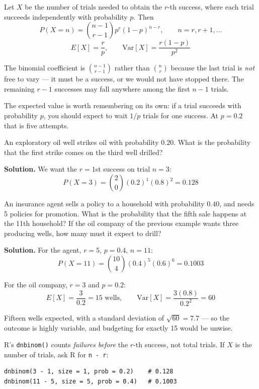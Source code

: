 \documentclass[a4paper,11pt]{article}
\begin{document}
\begin{keybox}
Let $X$ be the number of trials needed to obtain the $r$-th success, where each
trial succeeds independently with probability $p$. Then
\[ P(X = n) = \binom{n-1}{r-1}p^{r}(1-p)^{n-r}, \qquad n = r, r+1, \ldots \]
\[ E[X] = \frac{r}{p}, \qquad \mathrm{Var}[X] = \frac{r(1-p)}{p^{2}} \]
\end{keybox}

The binomial coefficient is $\binom{n-1}{r-1}$ rather than $\binom{n}{r}$
because the last trial is \emph{not} free to vary --- it must be a success, or
we would not have stopped there. The remaining $r-1$ successes may fall anywhere
among the first $n-1$ trials.

The expected value is worth remembering on its own: if a trial succeeds with
probability $p$, you should expect to wait $1/p$ trials for one success. At
$p = 0.2$ that is five attempts.

\begin{example}
An exploratory oil well strikes oil with probability $0.20$. What is the
probability that the first strike comes on the third well drilled?

\medskip
\textbf{Solution.} We want the $r = 1$st success on trial $n = 3$:
\[ P(X = 3) = \binom{2}{0}(0.2)^{1}(0.8)^{2} = 0.128 \]
\end{example}

\begin{example}
An insurance agent sells a policy to a household with probability $0.40$, and
needs 5 policies for promotion. What is the probability that the fifth sale
happens at the 11th household? If the oil company of the previous example wants
three producing wells, how many must it expect to drill?

\medskip
\textbf{Solution.} For the agent, $r = 5$, $p = 0.4$, $n = 11$:
\[ P(X = 11) = \binom{10}{4}(0.4)^{5}(0.6)^{6} = 0.1003 \]

For the oil company, $r = 3$ and $p = 0.2$:
\[ E[X] = \frac{3}{0.2} = 15 \text{ wells}, \qquad
   \mathrm{Var}[X] = \frac{3(0.8)}{0.2^{2}} = 60 \]

Fifteen wells expected, with a standard deviation of $\sqrt{60} = 7.7$ --- so
the outcome is highly variable, and budgeting for exactly 15 would be unwise.
\end{example}

\begin{watchbox}
R's \texttt{dnbinom()} counts \emph{failures before} the $r$-th success, not
total trials. If $X$ is the number of trials, ask R for \texttt{n - r}:

\begin{lstlisting}
dnbinom(3 - 1, size = 1, prob = 0.2)    # 0.128
dnbinom(11 - 5, size = 5, prob = 0.4)   # 0.1003
\end{lstlisting}
\end{watchbox}
\end{document}
